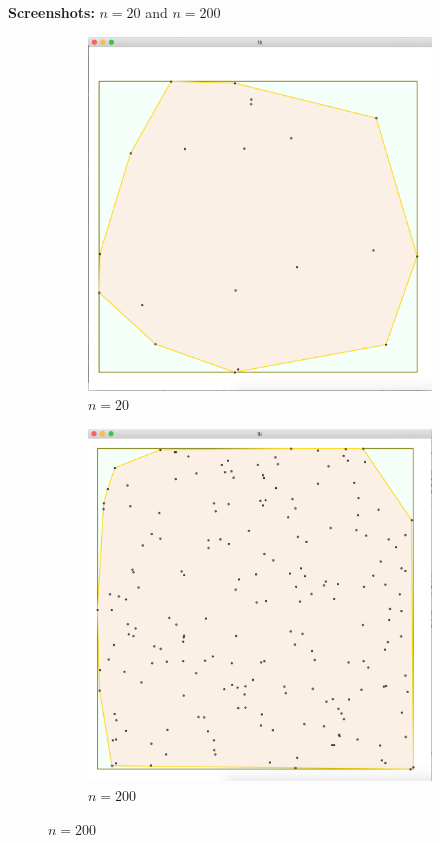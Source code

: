 \documentclass[09pt]{article}
\begin{document}
\vspace{0.3in}
\noindent
\textbf{Screenshots:} $n = 20$ and $n = 200$\\
\begin{figure}[h]
\centering
\begin{subfigure}[b]{0.45\textwidth}
\includegraphics[width=\textwidth]{n_20Points}
\caption{$n = 20$}
\label{fig:1}
\end{subfigure}
\hspace{0.5in}
\begin{subfigure}[b]{0.45\textwidth}
\includegraphics[width=\textwidth]{n_200Points}
\caption{$n = 200$}
\label{fig:2}
\end{subfigure}
\end{figure}
\end{document}
